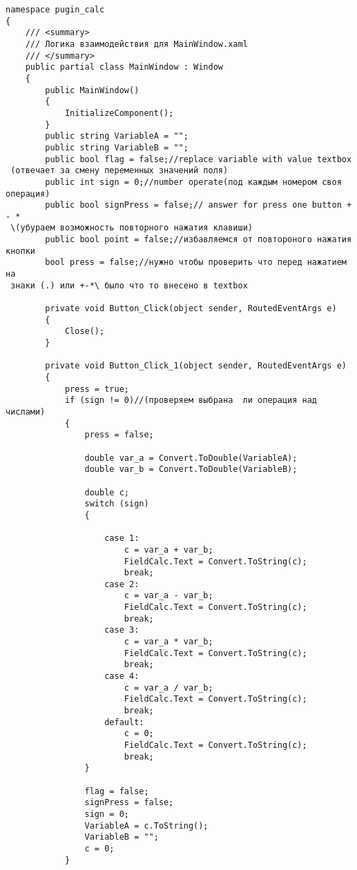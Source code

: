 {\begin{verbatim}
namespace pugin_calc
{
    /// <summary>
    /// Логика взаимодействия для MainWindow.xaml
    /// </summary>
    public partial class MainWindow : Window
    {
        public MainWindow()
        {
            InitializeComponent();
        }
        public string VariableA = "";
        public string VariableB = "";
        public bool flag = false;//replace variable with value textbox
 (отвечает за смену переменных значений поля)
        public int sign = 0;//number operate(под каждым номером своя операция)
        public bool signPress = false;// answer for press one button + - *
 \(убураем возможность повторного нажатия клавиши)
        public bool point = false;//избавляемся от повтороного нажатия кнопки
        bool press = false;//нужно чтобы проверить что перед нажатием на
 знаки (.) или +-*\ было что то внесено в textbox

        private void Button_Click(object sender, RoutedEventArgs e)
        {
            Close();
        }

        private void Button_Click_1(object sender, RoutedEventArgs e)
        {
            press = true;
            if (sign != 0)//(проверяем выбрана  ли операция над числами)
            {
                press = false;

                double var_a = Convert.ToDouble(VariableA);
                double var_b = Convert.ToDouble(VariableB);

                double c;
                switch (sign)
                {

                    case 1:
                        c = var_a + var_b;
                        FieldCalc.Text = Convert.ToString(c);
                        break;
                    case 2:
                        c = var_a - var_b;
                        FieldCalc.Text = Convert.ToString(c);
                        break;
                    case 3:
                        c = var_a * var_b;
                        FieldCalc.Text = Convert.ToString(c);
                        break;
                    case 4:
                        c = var_a / var_b;
                        FieldCalc.Text = Convert.ToString(c);
                        break;
                    default:
                        c = 0;
                        FieldCalc.Text = Convert.ToString(c);
                        break;
                }

                flag = false;
                signPress = false;
                sign = 0;
                VariableA = c.ToString();
                VariableB = "";
                c = 0;
            }


\end{verbatim}}

